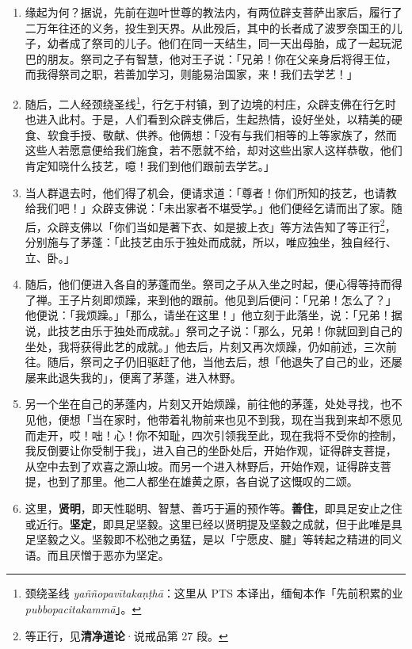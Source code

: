 \begin{enumerate}\item 缘起为何？据说，先前在迦叶世尊的教法内，有两位辟支菩萨出家后，履行了二万年往还的义务，投生到天界。从此殁后，其中的长者成了波罗奈国王的儿子，幼者成了祭司的儿子。他们在同一天结生，同一天出母胎，成了一起玩泥巴的朋友。祭司之子有智慧，他对王子说：「兄弟！你在父亲身后将得王位，而我得祭司之职，若善加学习，则能易治国家，来！我们去学艺！」
\item 随后，二人经颈绕圣线\footnote{颈绕圣线 \textit{yaññopavītakaṇṭhā}：这里从 PTS 本译出，缅甸本作「先前积累的业 \textit{pubbopacitakammā}」。}，行乞于村镇，到了边境的村庄，众辟支佛在行乞时也进入此村。于是，人们看到众辟支佛后，生起热情，设好坐处，以精美的硬食、软食手授、敬献、供养。他俩想：「没有与我们相等的上等家族了，然而这些人若愿意便给我们施食，若不愿就不给，却对这些出家人这样恭敬，他们肯定知晓什么技艺，噫！我们到他们跟前去学艺。」
\item 当人群退去时，他们得了机会，便请求道：「尊者！你们所知的技艺，也请教给我们吧！」众辟支佛说：「未出家者不堪受学。」他们便经乞请而出了家。随后，众辟支佛以「你们当如是著下衣、如是披上衣」等方法告知了等正行\footnote{等正行，见\textbf{清净道论}·说戒品第 27 段。}，分别施与了茅蓬：「此技艺由乐于独处而成就，所以，唯应独坐，独自经行、立、卧。」
\item 随后，他们便进入各自的茅蓬而坐。祭司之子从入坐之时起，便心得等持而得了禅。王子片刻即烦躁，来到他的跟前。他见到后便问：「兄弟！怎么了？」他便说：「我烦躁。」「那么，请坐在这里！」他立刻于此落坐，说：「兄弟！据说，此技艺由乐于独处而成就。」祭司之子说：「那么，兄弟！你就回到自己的坐处，我将获得此艺的成就。」他去后，片刻又再次烦躁，仍如前述，三次前往。随后，祭司之子仍旧驱赶了他，当他去后，想「他退失了自己的业，还屡屡来此退失我的」，便离了茅蓬，进入林野。
\item 另一个坐在自己的茅蓬内，片刻又开始烦躁，前往他的茅蓬，处处寻找，也不见他，便想「当在家时，他带着礼物前来也见不到我，现在当我到来却不愿见而走开，哎！咄！心！你不知耻，四次引领我至此，现在我将不受你的控制，我反倒要让你受制于我」，进入自己的坐卧处后，开始作观，证得辟支菩提，从空中去到了欢喜之源山坡。而另一个进入林野后，开始作观，证得辟支菩提，也到了那里。他二人都坐在雄黄之原，各自说了这慨叹的二颂。
\item 这里，\textbf{贤明}，即天性聪明、智慧、善巧于遍的预作等。\textbf{善住}，即具足安止之住或近行。\textbf{坚定}，即具足坚毅。这里已经以贤明提及坚毅之成就，但于此唯是具足坚毅之义。坚毅即不松弛之勇猛，是以「宁愿皮、腱」等转起之精进的同义语。而且厌憎于恶亦为坚定。\end{enumerate}

